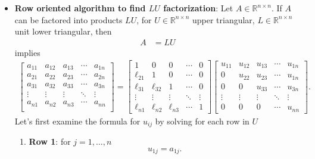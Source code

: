 \documentclass{report}
\begin{document}
\begin{itemize}
    \item \textbf{Row oriented algorithm to find $LU$ factorization}: 
        Let $A \in \mathbb{R}^{n\times n}$. If $A$ can be factored into products $LU$, for $U \in \mathbb{R}^{n\times n}$ upper triangular, $L \in \mathbb{R}^{n\times n}$ unit lower triangular, then
        \begin{align*}
            A &= LU  
        \end{align*}
        implies
        \begin{align*}
              \begin{bmatrix}
                a_{11} & a_{12} & a_{13} & \cdots & a_{1n} \\
                a_{21} & a_{22} & a_{23} & \cdots & a_{2n} \\
                a_{31} & a_{32} & a_{33} & \cdots & a_{3n} \\
                \vdots & \vdots & \vdots & \ddots & \vdots \\
                a_{n1} & a_{n2} & a_{n3} & \cdots & a_{nn} \\
            \end{bmatrix}
             = \begin{bmatrix}
                 1 & 0 & 0 & \cdots & 0 \\
                 \ell_{21} & 1 & 0 & \cdots & 0 \\
                 \ell_{31} & \ell_{32} & 1 & \cdots & 0 \\
                 \vdots & \vdots & \vdots & \ddots & \vdots \\
                 \ell_{n1} & \ell_{n2} & \ell_{n3} & \cdots & 1
             \end{bmatrix}
             \begin{bmatrix}
                 u_{11} & u_{12} & u_{13} & \cdots & u_{1n} \\
                 0  & u_{22} & u_{23} & \cdots & u_{1n} \\
                 0& 0& u_{33} & \cdots & u_{3n} \\
                 \vdots & \vdots & \vdots & \ddots & \vdots \\
                 0 & 0 & 0 & \cdots & u_{nn}
             \end{bmatrix}
        .\end{align*}
        Let's first examine the formula for $u_{ij}$ by solving for each row in $U$
        \begin{enumerate}
            \item \textbf{Row 1}: for $j=1,\dots,n$
                \[
                    u_{1j} = a_{1j}.
                \]


\end{enumerate}
\end{itemize}
\end{document}
